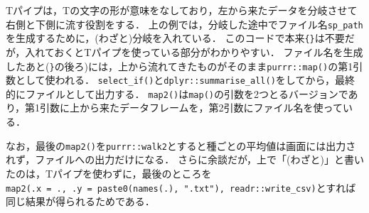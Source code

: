 \documentclass[
]{article}
\newenvironment{Shaded}{\begin{snugshade}}{\end{snugshade}}
\newcommand{\AttributeTok}[1]{\textcolor[rgb]{0.77,0.63,0.00}{#1}}
\newcommand{\CommentTok}[1]{\textcolor[rgb]{0.56,0.35,0.01}{\textit{#1}}}
\newcommand{\DecValTok}[1]{\textcolor[rgb]{0.00,0.00,0.81}{#1}}
\newcommand{\FunctionTok}[1]{\textcolor[rgb]{0.00,0.00,0.00}{#1}}
\newcommand{\NormalTok}[1]{#1}
\newcommand{\OtherTok}[1]{\textcolor[rgb]{0.56,0.35,0.01}{#1}}
\newcommand{\SpecialCharTok}[1]{\textcolor[rgb]{0.00,0.00,0.00}{#1}}
\newcommand{\StringTok}[1]{\textcolor[rgb]{0.31,0.60,0.02}{#1}}
\begin{document}
\begin{Shaded}
\end{Shaded}

Tパイプは，Tの文字の形が意味をなしており，左から来たデータを分岐させて右側と下側に流す役割をする．
上の例では，分岐した途中でファイル名\texttt{sp\_path}を生成するために，(わざと)分岐を入れている．
このコードで本来\texttt{\{\}}は不要だが，入れておくとTパイプを使っている部分がわかりやすい．
ファイル名を生成したあと(\texttt{\}}の後ろ)には，上から流れてきたものがそのまま\texttt{purrr::map()}の第1引数として使われる．
\texttt{select\_if()}と\texttt{dplyr::summarise\_all()}をしてから，最終的にファイルとして出力する．
\texttt{map2()}は\texttt{map()}の引数を2つとるバージョンであり，第1引数に上から来たデータフレームを，第2引数にファイル名を使っている．

なお，最後の\texttt{map2()}を\texttt{purrr::walk2}とすると種ごとの平均値は画面には出力されず，ファイルへの出力だけになる．
さらに余談だが，上で「(わざと)」と書いたのは，Tパイプを使わずに，最後のところを\texttt{map2(.x\ =\ .,\ .y\ =\ paste0(names(.),\ ".txt"),\ readr::write\_csv)}とすれば同じ結果が得られるためである．
\end{document}
